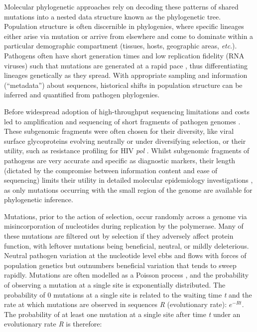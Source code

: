 \documentclass[11pt,oneside,letterpaper]{article}
\begin{document}
Molecular phylogenetic approaches rely on decoding these patterns of shared mutations into a nested data structure known as the phylogenetic tree.
Population structure is often discernible in phylogenies, where specific lineages either arise via mutation or arrive from elsewhere and come to dominate within a particular demographic compartment (tissues, hosts, geographic areas, \textit{etc}.).
Pathogens often have short generation times and low replication fidelity (RNA viruses) such that mutations are generated at a rapid pace \citep{drummond_measurably_2003,biek_measurably_2015}, thus differentiating lineages genetically as they spread.
With appropriate sampling and information (``metadata'') about sequences, historical shifts in population structure can be inferred and quantified from pathogen phylogenies.

Before widespread adoption of high-throughput sequencing limitations and costs led to amplification and sequencing of short fragments of pathogen genomes \citep{jin_genetic_1999,jin_proposal_2005}.
These subgenomic fragments were often chosen for their diversity, like viral surface glycoproteins evolving neutrally or under diversifying selection, or their utility, such as resistance profiling for HIV \textit{pol} \citep{kaye_phylogenetic_2008,rhee_human_2003}.
Whilst subgenomic fragments of pathogens are very accurate and specific as diagnostic markers, their length (dictated by the compromise between information content and ease of sequencing) limits their utility in detailed molecular epidemiology investigations \citep{wohl_co-circulating_2018}, as only mutations occurring with the small region of the genome are available for phylogenetic inference.

Mutations, prior to the action of selection, occur randomly across a genome via misincorporation of nucleotides during replication by the polymerase.
Many of these mutations are filtered out by selection if they adversely affect protein function, with leftover mutations being beneficial, neutral, or mildly deleterious.
Neutral pathogen variation at the nucleotide level ebbs and flows with forces of population genetics but outnumbers beneficial variation that tends to sweep rapidly.
Mutations are often modelled as a Poisson process \citep{jukes_evolution_1969}, and the probability of observing a mutation at a single site is exponentially distributed.
The probability of 0 mutations at a single site is related to the waiting time \textit{t} and the rate at which mutations are observed in sequences \textit{R} (evolutionary rate): $e^{-Rt}$.
The probability of at least one mutation at a single site after time \textit{t} under an evolutionary rate \textit{R} is therefore:
\end{document}
